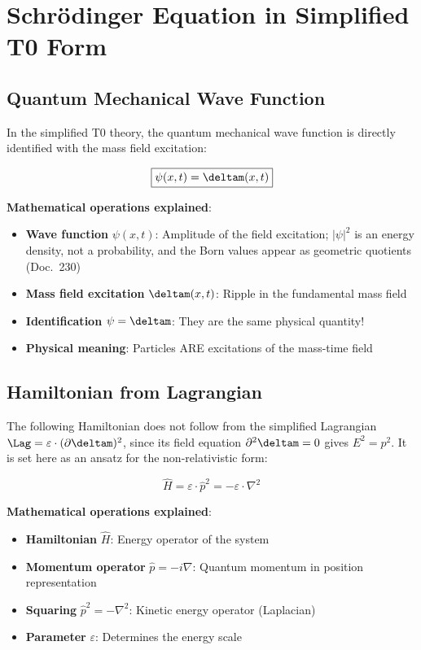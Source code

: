 	\section{Schrödinger Equation in Simplified T0 Form}
	
	\subsection{Quantum Mechanical Wave Function}
	
	In the simplified T0 theory, the quantum mechanical wave function is directly identified with the mass field excitation:
	
	\begin{equation}
		\boxed{\psi(x,t) = \deltam(x,t)}
		\label{eq:wavefunction_identification}
	\end{equation}
	
	\textbf{Mathematical operations explained}:
	\begin{itemize}
		\item \textbf{Wave function} $\psi(x,t)$: Amplitude of the field excitation; $|\psi|^2$ is an energy density, not a probability, and the Born values appear as geometric quotients (Doc.~230)
		\item \textbf{Mass field excitation} $\deltam(x,t)$: Ripple in the fundamental mass field
		\item \textbf{Identification} $\psi = \deltam$: They are the same physical quantity!
		\item \textbf{Physical meaning}: Particles ARE excitations of the mass-time field
	\end{itemize}
	
	\subsection{Hamiltonian from Lagrangian}
	
	The following Hamiltonian does not follow from the simplified Lagrangian $\Lag = \varepsilon \cdot (\partial \deltam)^2$, since its field equation $\partial^2\deltam = 0$ gives $E^2 = p^2$. It is set here as an ansatz for the non-relativistic form:
	
	\begin{equation}
		\hat{H} = \varepsilon \cdot \hat{p}^2 = -\varepsilon \cdot \nabla^2
		\label{eq:simplified_hamiltonian}
	\end{equation}
	
	\textbf{Mathematical operations explained}:
	\begin{itemize}
		\item \textbf{Hamiltonian} $\hat{H}$: Energy operator of the system
		\item \textbf{Momentum operator} $\hat{p} = -i\nabla$: Quantum momentum in position representation
		\item \textbf{Squaring} $\hat{p}^2 = -\nabla^2$: Kinetic energy operator (Laplacian)
		\item \textbf{Parameter} $\varepsilon$: Determines the energy scale
	\end{itemize}
	
